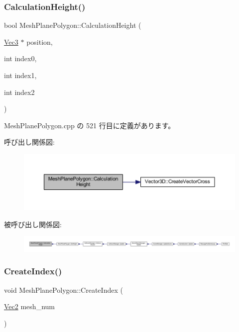 \subsubsection{\texorpdfstring{Calculation\+Height()}{CalculationHeight()}}
{\footnotesize\ttfamily bool Mesh\+Plane\+Polygon\+::\+Calculation\+Height (\begin{DoxyParamCaption}\item[{\mbox{\hyperlink{_vector3_d_8h_ab16f59e4393f29a01ec8b9bbbabbe65d}{Vec3}} $\ast$}]{position,  }\item[{int}]{index0,  }\item[{int}]{index1,  }\item[{int}]{index2 }\end{DoxyParamCaption})\hspace{0.3cm}{\ttfamily [private]}}



 Mesh\+Plane\+Polygon.\+cpp の 521 行目に定義があります。

呼び出し関係図\+:\nopagebreak
\begin{figure}[H]
\begin{center}
\leavevmode
\includegraphics[width=350pt]{class_mesh_plane_polygon_a815092659c44ccd2f626445c7dd95c9e_cgraph}
\end{center}
\end{figure}
被呼び出し関係図\+:
\nopagebreak
\begin{figure}[H]
\begin{center}
\leavevmode
\includegraphics[width=350pt]{class_mesh_plane_polygon_a815092659c44ccd2f626445c7dd95c9e_icgraph}
\end{center}
\end{figure}
\mbox{\label{class_mesh_plane_polygon_ae7067eb849977a12554633e604806f85}} 
\subsubsection{\texorpdfstring{Create\+Index()}{CreateIndex()}}
{\footnotesize\ttfamily void Mesh\+Plane\+Polygon\+::\+Create\+Index (\begin{DoxyParamCaption}\item[{\mbox{\hyperlink{_vector3_d_8h_a5ef6e95dfc5f9d3820b71772d99bbc25}{Vec2}}}]{mesh\+\_\+num }\end{DoxyParamCaption})\hspace{0.3cm}{\ttfamily [private]}}



